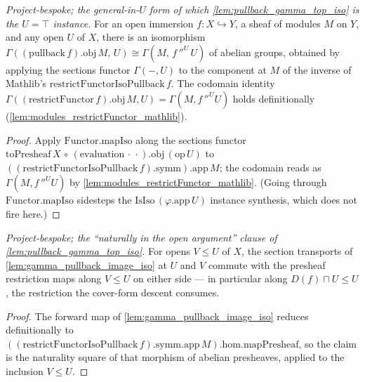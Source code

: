 \begin{lemma}

  \label{lem:gamma_pullback_image_iso}
  \textit{Project-bespoke; the general-in-\(U\) form of which \cref{lem:pullback_gamma_top_iso} is the
  \(U=\top\) instance.}
  For an open immersion \(f : X \hookrightarrow Y\), a sheaf of modules \(M\) on \(Y\), and any open
  \(U\) of \(X\), there is an isomorphism
  \(\Gamma((\mathrm{pullback}\,f).\mathrm{obj}\,M,\,U) \cong \Gamma(M,\,f\,''^{U}\,U)\) of abelian
  groups, obtained by applying the sections functor \(\Gamma(-,U)\) to the component at \(M\) of the
  inverse of Mathlib's \(\mathrm{restrictFunctorIsoPullback}\,f\). The codomain identity
  \(\Gamma((\mathrm{restrictFunctor}\,f).\mathrm{obj}\,M,U)=\Gamma(M,f\,''^{U}U)\) holds definitionally
  (\cref{lem:modules_restrictFunctor_mathlib}).
\end{lemma}
\begin{proof}
  Apply \(\mathrm{Functor.mapIso}\) along the sections functor
  \(\mathrm{toPresheaf}\,X \,\circ\, (\mathrm{evaluation}\,\cdot\,\cdot).\mathrm{obj}\,(\mathrm{op}\,U)\)
  to \(((\mathrm{restrictFunctorIsoPullback}\,f).\mathrm{symm}).\mathrm{app}\,M\); the codomain reads as
  \(\Gamma(M, f\,''^{U}U)\) by \cref{lem:modules_restrictFunctor_mathlib}. (Going through
  \(\mathrm{Functor.mapIso}\) sidesteps the \(\mathrm{IsIso}\,(\varphi.\mathrm{app}\,U)\) instance
  synthesis, which does not fire here.)
\end{proof}

\begin{lemma}

  \label{lem:gamma_pullback_image_iso_hom_naturality}
  \textit{Project-bespoke; the ``naturally in the open argument'' clause of
  \cref{lem:pullback_gamma_top_iso}.}
  For opens \(V \le U\) of \(X\), the section transports of \cref{lem:gamma_pullback_image_iso} at
  \(U\) and \(V\) commute with the presheaf restriction maps along \(V \le U\) on either side --- in
  particular along \(D(f)\sqcap U \le U\), the restriction the cover-form descent consumes.
\end{lemma}
\begin{proof}
  The forward map of \cref{lem:gamma_pullback_image_iso} reduces definitionally to
  \(((\mathrm{restrictFunctorIsoPullback}\,f).\mathrm{symm}.\mathrm{app}\,M).\mathrm{hom}.\mathrm{mapPresheaf}\),
  so the claim is the naturality square of that morphism of abelian presheaves, applied to the inclusion
  \(V \le U\).
\end{proof}

